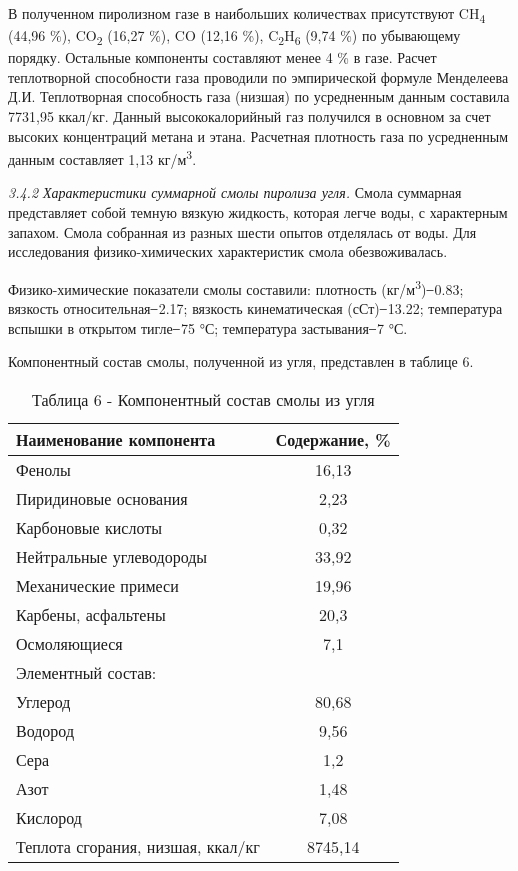\begin{multicols}{2}
В полученном пиролизном газе в наибольших количествах присутствуют
CH\textsubscript{4} (44,96 \%), CO\textsubscript{2} (16,27 \%), CO
(12,16 \%), C\textsubscript{2}H\textsubscript{6} (9,74 \%) по убывающему
порядку. Остальные компоненты составляют менее 4 \% в газе. Расчет
теплотворной способности газа проводили по эмпирической формуле
Менделеева Д.И. Теплотворная способность газа (низшая) по усредненным
данным составила 7731,95 ккал/кг. Данный высококалорийный газ получился
в основном за счет высоких концентраций метана и этана. Расчетная
плотность газа по усредненным данным составляет 1,13
кг/м\textsuperscript{3}.

\emph{3.4.2 Характеристики суммарной смолы пиролиза угля.} Смола
суммарная представляет собой темную вязкую жидкость, которая легче воды,
с характерным запахом. Смола собранная из разных шести опытов отделялась
от воды. Для исследования физико-химических характеристик смола
обезвоживалась.

Физико-химические показатели смолы составили: плотность
(кг/м\textsuperscript{3}) ̶ 0.83; вязкость относительная ̶ 2.17;
вязкость кинематическая (сСт) ̶ 13.22; температура вспышки в открытом
тигле ̶ 75 °С; температура застывания ̶ 7 °С.

Компонентный состав смолы, полученной из угля, представлен в таблице 6.
\end{multicols}

\begin{table}[H]
\caption*{Таблица 6 - Компонентный состав смолы из угля}
\centering
\begin{tabular}{|lc|}
\hline
\multicolumn{1}{|l|}{Наименование компонента} & \multicolumn{1}{l|}{Содержание, \%} \\ \hline
\multicolumn{1}{|l|}{Фенолы} & 16,13 \\ \hline
\multicolumn{1}{|l|}{Пиридиновые основания} & 2,23 \\ \hline
\multicolumn{1}{|l|}{Карбоновые кислоты} & 0,32 \\ \hline
\multicolumn{1}{|l|}{Нейтральные углеводороды} & 33,92 \\ \hline
\multicolumn{1}{|l|}{Механические примеси} & 19,96 \\ \hline
\multicolumn{1}{|l|}{Карбены, асфальтены} & 20,3 \\ \hline
\multicolumn{1}{|l|}{Осмоляющиеся} & 7,1 \\ \hline
\multicolumn{2}{|l|}{Элементный состав:} \\ \hline
\multicolumn{1}{|l|}{Углерод} & 80,68 \\ \hline
\multicolumn{1}{|l|}{Водород} & 9,56 \\ \hline
\multicolumn{1}{|l|}{Сера} & 1,2 \\ \hline
\multicolumn{1}{|l|}{Азот} & 1,48 \\ \hline
\multicolumn{1}{|l|}{Кислород} & 7,08 \\ \hline
\multicolumn{1}{|l|}{Теплота сгорания, низшая, ккал/кг} & 8745,14 \\ \hline
\end{tabular}
\end{table}


